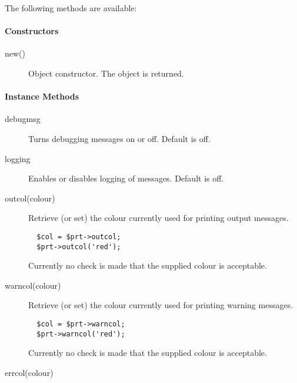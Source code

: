 \begin{description}
\begin{description}
The following methods are available:

\paragraph*{Constructors\label{ORAC::Print_Constructors}}
\begin{description}

\item[{new()}] \mbox{}

Object constructor. The object is returned.

\end{description}
\paragraph*{Instance Methods\label{ORAC::Print_Instance_Methods}}
\begin{description}

\item[{debugmsg}] \mbox{}

Turns debugging messages on or off. Default is off.


\item[{logging}] \mbox{}

Enables or disables logging of messages. Default is off.


\item[{outcol(colour)}] \mbox{}

Retrieve (or set) the colour currently used for printing output
messages.

\begin{verbatim}
  $col = $prt->outcol;
  $prt->outcol('red');
\end{verbatim}


Currently no check is made that the supplied colour is acceptable.


\item[{warncol(colour)}] \mbox{}

Retrieve (or set) the colour currently used for printing warning
messages.

\begin{verbatim}
  $col = $prt->warncol;
  $prt->warncol('red');
\end{verbatim}


Currently no check is made that the supplied colour is acceptable.


\item[{errcol(colour)}] \mbox{}


\end{description}
\end{description}
\end{description}

